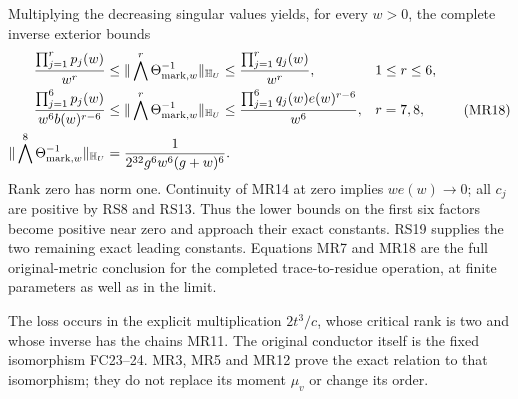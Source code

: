 Multiplying the decreasing singular values yields, for every
$w>0$, the complete inverse exterior bounds
\begin{equation}
 \begin{aligned}
 \frac{\prod_{j=1}^r p_j(w)}{w^r}
 &\le\|\bigwedge^r\Theta_{{\rm mark},w}^{-1}\|_{\mathbb H_U}
 \le\frac{\prod_{j=1}^r q_j(w)}{w^r},&&1\le r\le6,\\
 \frac{\prod_{j=1}^6p_j(w)}{w^6b(w)^{r-6}}
 &\le\|\bigwedge^r\Theta_{{\rm mark},w}^{-1}\|_{\mathbb H_U}
 \le\frac{\prod_{j=1}^6q_j(w)e(w)^{r-6}}{w^6},&&r=7,8,\\
 \|\bigwedge^8\Theta_{{\rm mark},w}^{-1}\|_{\mathbb H_U}
 &=\frac1{2^{32}g^6w^6(g+w)^6}.
 \end{aligned}\tag{MR18}
\end{equation}
Rank zero has norm one. Continuity of MR14 at zero implies
$we(w)\to0$; all $c_j$ are positive by RS8 and RS13.
Thus the lower bounds on the first six factors become positive
near zero and approach their exact constants. RS19 supplies
the two remaining exact leading constants. Equations MR7 and
MR18 are the full original-metric conclusion for the completed
trace-to-residue operation, at finite parameters as well as in
the limit.

The loss occurs in the explicit multiplication $2t^3/c$, whose
critical rank is two and whose inverse has the chains MR11.
The original conductor itself is the fixed isomorphism FC23--24.
MR3, MR5 and MR12 prove the exact relation to that isomorphism;
they do not replace its moment $\mu_v$ or change its order.
